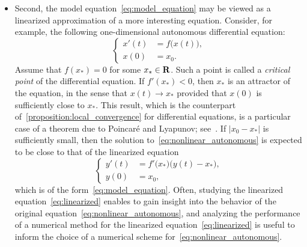 \begin{itemize}
    \item
        Second, the model equation~\eqref{eq:model_equation} may be viewed as a linearized approximation of a more interesting equation.
        Consider, for example, the following one-dimensional autonomous differential equation:
        \begin{equation}
            \label{eq:nonlinear_autonomous}
            \left\{
            \begin{aligned}
                x'(t) &= f\bigl(x(t)\bigr), \\
                x(0) &= x_0.
            \end{aligned}
            \right.
        \end{equation}
        Assume that $f(x_*)= 0$ for some $x_* \in \mathbf R$.
        Such a point is called a \emph{critical point} of the differential equation.
        If $f'(x_*) < 0$,
        then $x_*$ is an attractor of the equation,
        in the sense that $x(t) \to x_*$ provided that $x(0)$ is sufficiently close to $x_*$.
        This result, which is the counterpart of~\cref{proposition:local_convergence} for differential equations,
        is a particular case of a theorem due to Poincaré and Lyapunov;
        see~\cite[Theorem 7.1]{MR1422255}.
        If $\lvert x_0 - x_* \rvert$ is sufficiently small,
        then the solution to~\eqref{eq:nonlinear_autonomous} is expected to be close
        to that of the linearized equation
        \begin{equation}
            \label{eq:linearized}
            \left\{
            \begin{aligned}
                y'(t) &= f'\bigl(x_*\bigr) \bigl(y(t) - x_*\bigr), \\
                y(0) &= x_0,
            \end{aligned}
            \right.
        \end{equation}
        which is of the form~\eqref{eq:model_equation}.
        Often, studying the linearized equation~\eqref{eq:linearized} enables to gain insight into the behavior of the original equation~\eqref{eq:nonlinear_autonomous},
        and analyzing the performance of a numerical method for the linearized equation~\eqref{eq:linearized} is useful
        to inform the choice of a numerical scheme for~\eqref{eq:nonlinear_autonomous}.


\end{itemize}
